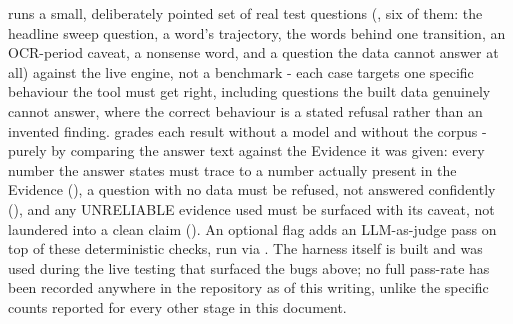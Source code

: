 \documentclass[11pt]{article}
\begin{document}
 runs a small, deliberately pointed set of real
test questions (, six of them: the headline sweep
question, a word's trajectory, the words behind one transition, an
OCR-period caveat, a nonsense word, and a question the data cannot
answer at all) against the live engine, not a benchmark - each case
targets one specific behaviour the tool must get right, including
questions the built data genuinely cannot answer, where the correct
behaviour is a stated refusal rather than an invented finding.
 grades each result without a model and without the
corpus - purely by comparing the answer text against the Evidence it
was given: every number the answer states must trace to a number
actually present in the Evidence (), a
question with no data must be refused, not answered confidently
(), and any UNRELIABLE evidence used must be
surfaced with its caveat, not laundered into a clean claim
(). An optional  flag adds an
LLM-as-judge pass on top of these deterministic checks, run via
. The harness itself is built and was used
during the live testing that surfaced the bugs above; no full
 pass-rate has been recorded anywhere in the repository
as of this writing, unlike the specific counts reported for every
other stage in this document.
\end{document}

